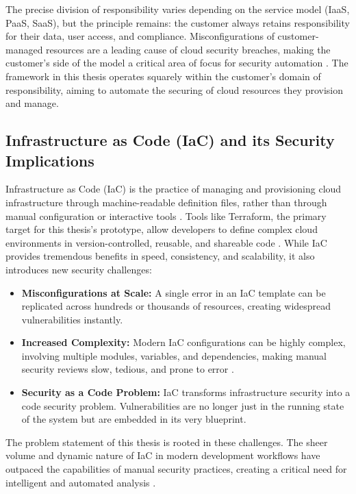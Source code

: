 The precise division of responsibility varies depending on the service model (IaaS, PaaS, SaaS), but the principle remains: the customer always retains responsibility for their data, user access, and compliance. Misconfigurations of customer-managed resources are a leading cause of cloud security breaches, making the customer's side of the model a critical area of focus for security automation \cite{cloud_security_alliance_mitigating_2023}. The framework in this thesis operates squarely within the customer's domain of responsibility, aiming to automate the securing of cloud resources they provision and manage.

\subsection{Infrastructure as Code (IaC) and its Security Implications}
Infrastructure as Code (IaC) is the practice of managing and provisioning cloud infrastructure through machine-readable definition files, rather than through manual configuration or interactive tools \cite{dasari_infrastructure_2025}. Tools like Terraform, the primary target for this thesis's prototype, allow developers to define complex cloud environments in version-controlled, reusable, and shareable code \cite{howard_terraform_2022-1}. While IaC provides tremendous benefits in speed, consistency, and scalability, it also introduces new security challenges:
\begin{itemize}
    \item \textbf{Misconfigurations at Scale:} A single error in an IaC template can be replicated across hundreds or thousands of resources, creating widespread vulnerabilities instantly.
    \item \textbf{Increased Complexity:} Modern IaC configurations can be highly complex, involving multiple modules, variables, and dependencies, making manual security reviews slow, tedious, and prone to error \cite{tunc_cloud_2017}.
    \item \textbf{Security as a Code Problem:} IaC transforms infrastructure security into a code security problem. Vulnerabilities are no longer just in the running state of the system but are embedded in its very blueprint.
\end{itemize}
The problem statement of this thesis is rooted in these challenges. The sheer volume and dynamic nature of IaC in modern development workflows have outpaced the capabilities of manual security practices, creating a critical need for intelligent and automated analysis \cite{fu_ai_2025}.

